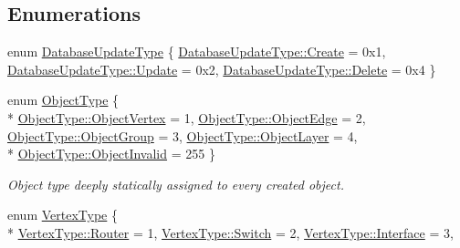 \subsection*{Enumerations}
\begin{DoxyCompactItemize}
\item 
enum \hyperlink{namespace_n_m_1_1_o_d_b_a66aebefa38a81f7eeb64526035e77dfa}{Database\+Update\+Type} \{ \hyperlink{namespace_n_m_1_1_o_d_b_a66aebefa38a81f7eeb64526035e77dfaa686e697538050e4664636337cc3b834f}{Database\+Update\+Type\+::\+Create} = 0x1, 
\hyperlink{namespace_n_m_1_1_o_d_b_a66aebefa38a81f7eeb64526035e77dfaa06933067aafd48425d67bcb01bba5cb6}{Database\+Update\+Type\+::\+Update} = 0x2, 
\hyperlink{namespace_n_m_1_1_o_d_b_a66aebefa38a81f7eeb64526035e77dfaaf2a6c498fb90ee345d997f888fce3b18}{Database\+Update\+Type\+::\+Delete} = 0x4
 \}
\item 
enum \hyperlink{namespace_n_m_1_1_o_d_b_ac9f60beb4a1c8a6240dd0c8baa281345}{Object\+Type} \{ \\*
\hyperlink{namespace_n_m_1_1_o_d_b_ac9f60beb4a1c8a6240dd0c8baa281345a554481c225bae1bff5a2d15e6f8b7400}{Object\+Type\+::\+Object\+Vertex} = 1, 
\hyperlink{namespace_n_m_1_1_o_d_b_ac9f60beb4a1c8a6240dd0c8baa281345a397aca5cf8c70dcc546fd34c10f9f9c5}{Object\+Type\+::\+Object\+Edge} = 2, 
\hyperlink{namespace_n_m_1_1_o_d_b_ac9f60beb4a1c8a6240dd0c8baa281345a03d81c8b3dfdf88091a261d6a92f75a6}{Object\+Type\+::\+Object\+Group} = 3, 
\hyperlink{namespace_n_m_1_1_o_d_b_ac9f60beb4a1c8a6240dd0c8baa281345a00f6cdcdc37108f9d9eee06bdb05d31e}{Object\+Type\+::\+Object\+Layer} = 4, 
\\*
\hyperlink{namespace_n_m_1_1_o_d_b_ac9f60beb4a1c8a6240dd0c8baa281345a950d7ba5dd3429e9e53e117271336ef6}{Object\+Type\+::\+Object\+Invalid} = 255
 \}\begin{DoxyCompactList}\small\item\em Object type deeply statically assigned to every created object. \end{DoxyCompactList}
\item 
enum \hyperlink{namespace_n_m_1_1_o_d_b_a74e0c94daaeea6f7e783c03a8c921022}{Vertex\+Type} \{ \\*
\hyperlink{namespace_n_m_1_1_o_d_b_a74e0c94daaeea6f7e783c03a8c921022a9cd72ef099fa539e3b793ffb8d36f0bd}{Vertex\+Type\+::\+Router} = 1, 
\hyperlink{namespace_n_m_1_1_o_d_b_a74e0c94daaeea6f7e783c03a8c921022abbc155fb2b111bf61c4f5ff892915e6b}{Vertex\+Type\+::\+Switch} = 2, 
\hyperlink{namespace_n_m_1_1_o_d_b_a74e0c94daaeea6f7e783c03a8c921022a3c1aac82863ed9e5a9aca8ce687f711d}{Vertex\+Type\+::\+Interface} = 3, 

\end{DoxyCompactItemize}

